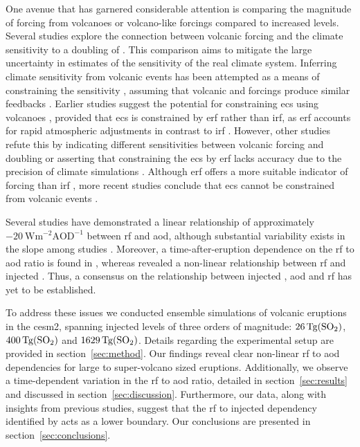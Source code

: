 \documentclass{ametsocV6.1}
\newcommand{\iso}[1][i]{{#1}njected \ce{SO2}}
\begin{document}
One avenue that has garnered considerable attention is comparing the magnitude of
forcing from volcanoes or volcano-like forcings compared to increased  levels.
Several studies explore the connection between volcanic forcing and the climate
sensitivity to a doubling of 
\citep{boer2007,marvel2016,merlis2014,ollila2016,richardson2019,salvi2022,wigley2005}.
This comparison aims to mitigate the large uncertainty in estimates of the sensitivity
of the real climate system. Inferring climate sensitivity from volcanic events has been
attempted as a means of constraining the sensitivity \citep{boer2007}, assuming that
volcanic and  forcings produce similar feedbacks \citep{pauling2023}. Earlier
studies suggest the potential for constraining \gls{ecs} using volcanoes
\citep{bender2010}, provided that \gls{ecs} is constrained by \gls{erf} rather than
\gls{irf}, as \gls{erf} accounts for rapid atmospheric adjustments in contrast to
\gls{irf} \citep{richardson2019}. However, other studies refute this by indicating
different sensitivities between volcanic forcing and  doubling
\citep{douglass2006} or asserting that constraining the \gls{ecs} by \gls{erf} lacks
accuracy due to the precision of climate simulations \citep{boer2007,salvi2022}.
Although \gls{erf} offers a more suitable indicator of forcing than \gls{irf}
\citep{marvel2016,richardson2019}, more recent studies conclude that \gls{ecs} cannot be
constrained from volcanic events \citep{pauling2023}.

Several studies have demonstrated a linear relationship of approximately
\(-\SI{20}{\watt\metre^{-2}\mathrm{AOD}^{-1}}\) between \gls{rf} and \gls{aod}, although
substantial variability exists in the slope among studies
\citep{mills2017,hansen2005,gregory2016,marshall2020,pitari2016b}. Moreover, a
time-after-eruption dependence on the \gls{rf} to \gls{aod} ratio is found in
\citet{marshall2020}, whereas \citet{niemeier2015} revealed a non-linear relationship
between \gls{rf} and \iso{}. Thus, a consensus on the relationship between \iso{},
\gls{aod} and \gls{rf} has yet to be established.

To address these issues we conducted ensemble simulations of volcanic eruptions in the
\gls{cesm2}, spanning \iso{} levels of three orders of magnitude:
\(\SI{26}{\tera\gram(\ce{SO2})}\), \(\SI{400}{\tera\gram(\ce{SO2})}\) and
\(\SI{1629}{\tera\gram(\ce{SO2})}\). Details regarding the experimental setup are
provided in section~\ref{sec:method}. Our findings reveal clear non-linear \gls{rf} to
\gls{aod} dependencies for large to super-volcano sized eruptions. Additionally, we
observe a time-dependent variation in the \gls{rf} to \gls{aod} ratio, detailed in
section~\ref{sec:results} and discussed in section~\ref{sec:discussion}. Furthermore,
our data, along with insights from previous studies, suggest that the \gls{rf} to \iso{}
dependency identified by \citet{niemeier2015} acts as a lower boundary. Our conclusions
are presented in section~\ref{sec:conclusions}.
\end{document}
